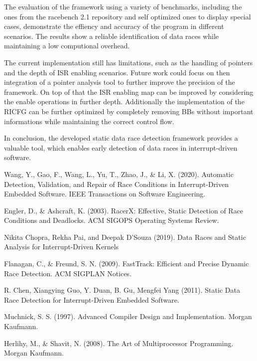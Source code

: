 \documentclass[
fancyheadings, %
%
%
]{stsreprt}
\begin{document}
{The evaluation of the framework using a variety of benchmarks, including the ones from the racebench 2.1 repository and self optimized ones to display special cases, demonstrate the effiency and accuracy of the program in different scenarios. The results show a reliable identification of data races while maintaining a low computional overhead.

The current implementation still has limitations, such as the handling of pointers and the depth of \ac{ISR} enabling scenarios. Future work could focus on then integration of a pointer analysis tool to further improve the precision of the framework. On top of that the \ac{ISR} enabling map can be improved by considering the enable operations in further depth. Additionally the implementation of the \ac{RICFG} can be further optimized by completely removing \aclp{BB} without important informations while maintaining the correct control flow.

In conclusion, the developed static data race detection framework provides a valuable tool, which enables early detection of data races in interrupt-driven software. 


\appendix

\backmatter{}
\begin{thebibliography}{9}
	Wang, Y., Gao, F., Wang, L., Yu, T., Zhao, J., \& Li, X. (2020). Automatic Detection, Validation, and Repair of Race Conditions in Interrupt-Driven Embedded Software. IEEE Transactions on Software Engineering.
	
	Engler, D., \& Ashcraft, K. (2003). RacerX: Effective, Static Detection of Race Conditions and Deadlocks. ACM SIGOPS Operating Systems Review.
	
	Nikita Chopra, Rekha Pai, and Deepak D’Souza (2019). Data Races and Static Analysis for Interrupt-Driven Kernels
	
	Flanagan, C., \& Freund, S. N. (2009). FastTrack: Efficient and Precise Dynamic Race Detection. ACM SIGPLAN Notices.
	
	R. Chen, Xiangying Guo, Y. Duan, B. Gu, Mengfei Yang (2011). Static Data Race Detection for Interrupt-Driven Embedded Software.
			
	Muchnick, S. S. (1997). Advanced Compiler Design and Implementation. Morgan Kaufmann.
		
	Herlihy, M., \& Shavit, N. (2008). The Art of Multiprocessor Programming. Morgan Kaufmann.
	

\end{thebibliography}}
\end{document}
